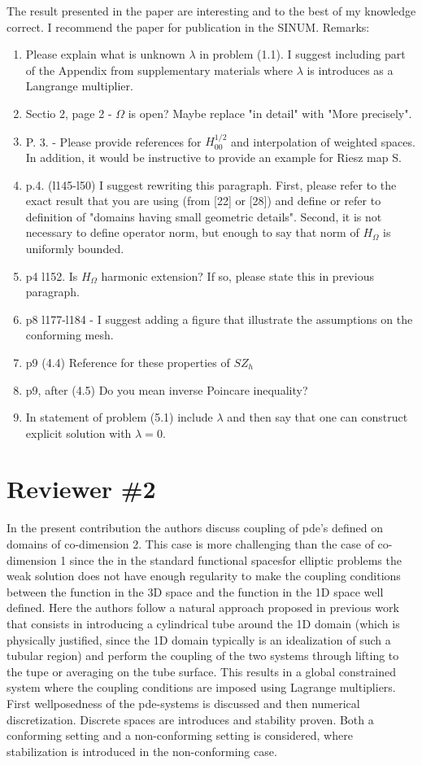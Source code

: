 \documentclass{article}
\begin{document}
The result presented in the paper are interesting and to the best of my knowledge correct. I recommend the paper for publication in the SINUM.
Remarks:
\begin{enumerate}
    \item Please explain what is unknown $\lambda$ in problem (1.1). I suggest including part of the Appendix from supplementary materials where $\lambda$ is introduces as a Langrange multiplier.
    \item Sectio 2, page 2 - $\Omega$ is open? Maybe replace "in detail" with "More precisely".
    \item P. 3. - Please provide references for $H^{1/2}_{00}$ and interpolation of weighted spaces. In addition, it would be instructive to provide an example for Riesz map S.
    \item p.4. (l145-l50) I suggest rewriting this paragraph. First, please refer to the exact result that you are using (from [22] or [28]) and define or refer to definition of "domains having small geometric details". Second, it is not necessary to define operator norm, but enough to say that norm of $H_{\Omega}$ is uniformly bounded.
    \item p4 l152. Is $H_{\Omega}$ harmonic extension? If so, please state this in previous paragraph.
    \item p8 l177-l184 - I suggest adding a figure that illustrate the assumptions on the conforming mesh.
    \item p9 (4.4) Reference for these properties of $SZ_h$
    \item p9, after (4.5) Do you mean inverse Poincare inequality?
    \item In statement of problem (5.1) include $\lambda$ and then say that one can construct explicit solution with $\lambda=0$.
\end{enumerate}

\section*{Reviewer \#2}

In the present contribution the authors discuss coupling of pde's
defined on domains of co-dimension 2. This case is more challenging
than the case of co-dimension 1 since the in the standard functional
spacesfor elliptic problems the weak solution does not
have enough regularity to make the coupling conditions between the
function in the 3D space and the function in the 1D space well
defined. Here the authors follow a natural approach proposed in previous
work that consists in introducing a cylindrical tube
around the 1D domain (which is physically justified, since the 1D
domain typically is an idealization of such a tubular region) and perform
the coupling of the two systems through lifting to the tupe or
averaging on the tube surface. This results in a global constrained
system where the coupling conditions are imposed using Lagrange
multipliers.
First wellposedness of the pde-systems is discussed and then numerical
discretization. Discrete spaces are introduces and stability
proven. Both a conforming setting and a non-conforming setting is
considered, where stabilization is introduced in the non-conforming
case.
\end{document}
